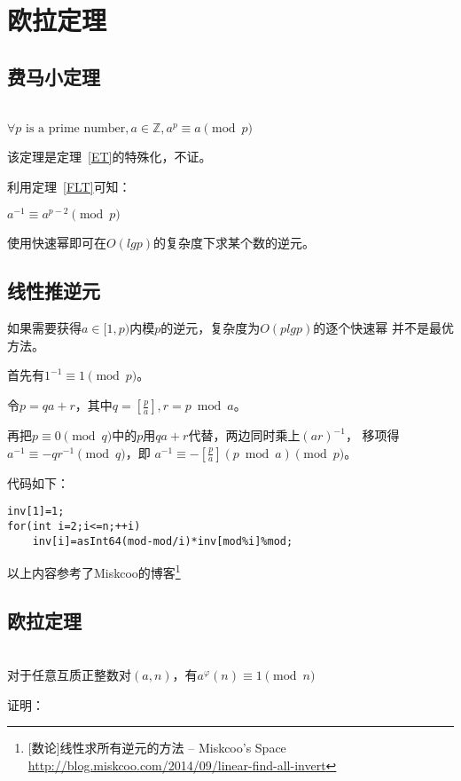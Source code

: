 \section{欧拉定理}
\subsection{费马小定理}\label{FLTS}
\begin{theorem}\label{FLT}
	~\\
	$\forall p \textrm{ is a prime number},a\in \mathbb{Z},a^p \equiv a \pmod{p}$
\end{theorem}

该定理是定理~\ref{ET}的特殊化，不证。

利用定理~\ref{FLT}可知：

\begin{inference}
	$a^{-1} \equiv a^{p-2} \pmod{p}$
\end{inference}

使用快速幂即可在$O(lgp)$的复杂度下求某个数的逆元。

\subsection{线性推逆元}

如果需要获得$a\in [1,p)$内模$p$的逆元，复杂度为$O(plgp)$的逐个快速幂
并不是最优方法。

首先有$1^{-1}\equiv 1 \pmod{p}$。

令$p=qa+r$，其中$q=[\frac{p}{a}],r=p \bmod a$。

再把$p \equiv 0 \pmod{q}$中的$p$用$qa+r$代替，两边同时乘上$(ar)^{-1}$，
移项得$a^{-1}\equiv -qr^{-1} \pmod{q}$，即
$a^{-1}\equiv -[\frac{p}{a}](p \bmod a) \pmod{p}$。

代码如下：
\begin{lstlisting}[title=inv]
inv[1]=1;
for(int i=2;i<=n;++i)
    inv[i]=asInt64(mod-mod/i)*inv[mod%i]%mod;
\end{lstlisting}

以上内容参考了Miskcoo的博客\footnote{[数论]线性求所有逆元的方法 – Miskcoo's Space
	\url{http://blog.miskcoo.com/2014/09/linear-find-all-invert}}

\subsection{欧拉定理}
\begin{theorem}\label{ET}
	~\\
	对于任意互质正整数对$(a,n)$，有$a^\varphi(n) \equiv 1 \pmod{n}$
\end{theorem}
证明：

